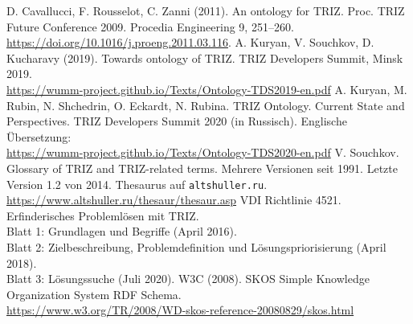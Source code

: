 \documentclass[11pt,a4paper]{article}
\begin{document}
\begin{thebibliography}{xxx}
 D. Cavallucci, F. Rousselot, C. Zanni (2011). An ontology
  for TRIZ. Proc. TRIZ Future Conference 2009. Procedia Engineering 9,
  251–260.  \url{https://doi.org/10.1016/j.proeng.2011.03.116}.
 A. Kuryan, V. Souchkov, D. Kucharavy (2019). Towards
  ontology of TRIZ. TRIZ Developers Summit, Minsk 2019.
  \\ \url{https://wumm-project.github.io/Texts/Ontology-TDS2019-en.pdf}
 A. Kuryan, M. Rubin, N. Shchedrin, O. Eckardt, N. Rubina.
  TRIZ Ontology. Current State and Perspectives. TRIZ Developers Summit 2020
  (in Russisch). Englische Übersetzung:
  \\ \url{https://wumm-project.github.io/Texts/Ontology-TDS2020-en.pdf}
 V. Souchkov. Glossary of TRIZ and TRIZ-related terms. Mehrere
  Versionen seit 1991. Letzte Version 1.2 von 2014.
 Thesaurus auf \texttt{altshuller.ru}.\\
  \url{https://www.altshuller.ru/thesaur/thesaur.asp}
 VDI Richtlinie 4521. Erfinderisches Problemlösen mit TRIZ.\\
  Blatt 1: Grundlagen und Begriffe (April 2016).\\ Blatt 2: Zielbeschreibung,
  Problemdefinition und Lösungspriorisierung (April 2018).\\ Blatt 3:
  Lösungssuche (Juli 2020). 
 W3C (2008). SKOS Simple Knowledge Organization System RDF
  Schema.\\
  \url{https://www.w3.org/TR/2008/WD-skos-reference-20080829/skos.html}
\end{thebibliography}
\end{document}
